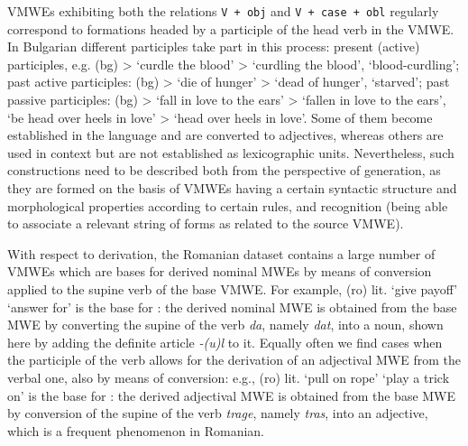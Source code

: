 \documentclass[output=paper,colorlinks,citecolor=brown]{langscibook}
\begin{document}
VMWEs exhibiting both the relations \texttt{V + obj} and \texttt{V + case + obl} regularly correspond to formations headed by a participle of the head verb in the VMWE. In Bulgarian different participles take part in this process: present (active) participles, e.g. (bg)  >  {`curdle the blood' > `curdling the blood', `blood-curdling'}; past active participles: (bg)  >  {`die of hunger' > `dead of hunger', `starved'}; past passive participles: (bg)  >  {`fall in love to the ears' > `fallen in love to the ears', `be head over heels in love' > `head over heels in love'}. Some of them become established in the language and are converted to adjectives, whereas others are used in context but are not established as lexicographic units. Nevertheless, such constructions need to be described both from the perspective of generation, as they are formed on the basis of VMWEs having a certain syntactic structure and morphological properties according to certain rules, and recognition (being able to associate a relevant string of forms as related to the source VMWE).

With respect to derivation, the Romanian dataset contains a large number of VMWEs which are bases for derived nominal MWEs by means of conversion applied to the supine verb of the base VMWE. For example, (ro)  lit. `give payoff' `answer for' is the base for : the derived nominal MWE is obtained from the base MWE by converting the supine of the verb \textit{da}, namely \textit{dat}, into a noun, shown here by adding the definite article \textit{-(u)l} to it. Equally often we find cases when the participle of the verb allows for the derivation of an adjectival MWE from the verbal one, also by means of conversion: e.g., (ro)  lit. `pull on rope' `play a trick on' is the base for : the derived adjectival MWE is obtained from the base MWE by conversion of the supine of the verb \textit{trage}, namely \textit{tras}, into an adjective, which is a frequent phenomenon in Romanian.




\end{document}
